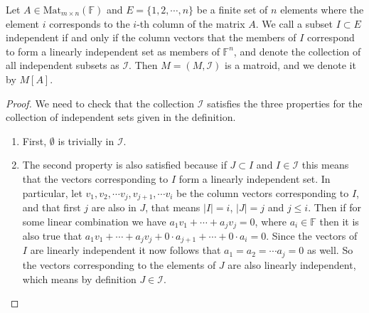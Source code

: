 \begin{theorem}

    Let $A \in \mathrm{Mat} _{m \times n}(\mathbb{F})$ and $E = \{1, 2, \cdots, n\}$ be a finite set of $n$ elements where the element $i$ corresponds to the $i$-th column of the matrix $A$. We call a subset $I \subset E$ independent if and only if the column vectors that the members of $I$ correspond to form a linearly independent set as members of $\mathbb{F}^n$, and denote the collection of all independent subsets as $\mathcal{I}$. Then $M = (M, \mathcal{I})$ is a matroid, and we denote it by $M[A]$.
    
\end{theorem}

\begin{proof}
    We need to check that the collection $\mathcal{I}$ satisfies the three properties for the collection of independent sets given in the definition. 

\begin{enumerate}

    \item First, $\emptyset$ is trivially in $\mathcal{I}$.
    
    \item The second property is also satisfied because if $J \subset I$ and $I \in \mathcal{I}$ this means that the vectors corresponding to $I$ form a linearly independent set. In particular, let $v_1, v_2, \cdots v_j, v_{j+1}, \cdots v_{i}$ be the column vectors corresponding to $I$, and that first $j$ are also in $J$, that means $|I| = i$, $|J| = j$ and $j \leq i$. Then if for some linear combination we have $a_1v_1 + \cdots + a_jv_j = 0$, where $a_i \in \mathbb{F}$ then it is also true that $a_1v_1 + \cdots + a_jv_j + 0 \cdot a_{j+1} + \cdots + 0 \cdot a_i = 0$. Since the vectors of $I$ are linearly independent it now follows that $a_1 = a_2 = \cdots a_j = 0$ as well. So the vectors corresponding to the elements of $J$ are also linearly independent, which means by definition $J \in \mathcal{I}$.


\end{enumerate}
\end{proof}
